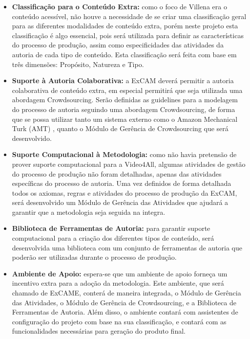 \documentclass{sig-alternate}
\begin{document}
\begin{itemize}
\item \textbf{Classificação para o Conteúdo Extra:} como o foco de Villena\cite{Villena2016} era o conteúdo acessível, não houve a necessidade de se criar uma classificação geral para as diferentes modalidades de conteúdo extra, porém neste projeto esta classificação é algo essencial, pois será utilizada para definir as características do processo de produção, assim como especificidades das atividades da autoria de cada tipo de conteúdo. Esta classificação será feita com base em três dimensões: Propósito, Natureza e Tipo.

\item \textbf{Suporte à Autoria Colaborativa:} a ExCAM deverá permitir a autoria colaborativa de conteúdo extra, em especial permitirá que seja utilizada uma abordagem Crowdsourcing. Serão definidas as guidelines para a modelagem do processo de autoria seguindo uma abordagem Crowdsourcing, de forma que se possa utilizar tanto um sistema externo como o Amazon Mechanical Turk (AMT) \cite{Difallah:2015:DMC:2736277.2741685}, quanto o Módulo de Gerência de Crowdsourcing que será desenvolvido.


\item \textbf{Suporte Computacional à Metodologia:} como não havia pretensão de prover suporte computacional para a Video4All, algumas atividades de gestão do processo de produção não foram detalhadas, apenas das atividades específicas do processo de autoria. Uma vez definidos de forma detalhada todos os axiomas, regras e atividades do processo de produção da ExCAM, será desenvolvido um Módulo de Gerência das Atividades que ajudará a garantir que a metodologia seja seguida na integra.

\item \textbf{Biblioteca de Ferramentas de Autoria:} para garantir suporte computacional para a criação dos diferentes tipos de conteúdo, será desenvolvida uma biblioteca com um conjunto de ferramentas de autoria que poderão ser utilizadas durante o processo de produção.  

\item \textbf{Ambiente de Apoio:} espera-se que um ambiente de apoio forneça um incentivo extra para a adoção da metodologia. Este ambiente, que será chamado de ExCAME, conterá de maneira integrada, o Módulo de Gerência das Atividades, o Módulo de Gerência de Crowdsourcing, e a Biblioteca de Ferramentas de Autoria. Além disso, o ambiente contará com assistentes de configuração do projeto com base na sua classificação, e contará com as funcionalidades necessárias para geração do produto final.


\end{itemize}
\end{document}
